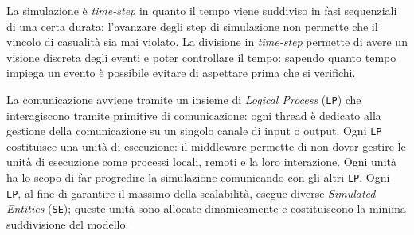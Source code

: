 La simulazione è \textit{time-step} in quanto il tempo viene suddiviso in fasi sequenziali di una certa durata: l'avanzare degli step di simulazione non permette che il vincolo di casualità sia mai violato. La divisione in \textit{time-step} permette di avere un visione discreta degli eventi e poter controllare il tempo: sapendo quanto tempo impiega un evento è possibile evitare di aspettare prima che si verifichi.
\begin{table}[H]
    \caption{Overhead (e ritardo) di copertura per ciascun algoritmo per una rete di $500$ nodi, $1000$ archi, diametro to $10$, \texttt{TTL}$=16$ e cache fissa a $256$ simulata tramite \textit{LUNES}}
\end{table}
La comunicazione avviene tramite un insieme di \textit{Logical Process} (\texttt{LP}) che interagiscono tramite primitive di comunicazione: ogni thread è dedicato alla gestione della comunicazione su un singolo canale di input o output. Ogni \texttt{LP} costituisce una unità di esecuzione: il middleware permette di non dover gestire le unità di esecuzione come processi locali, remoti e la loro interazione. Ogni unità ha lo scopo di far progredire la simulazione comunicando con gli altri \texttt{LP}. Ogni \texttt{LP}, al fine di garantire il massimo della scalabilità, esegue diverse \textit{Simulated Entities} (\texttt{SE}); queste unità sono allocate dinamicamente e costituiscono la minima suddivisione del modello.\newline
